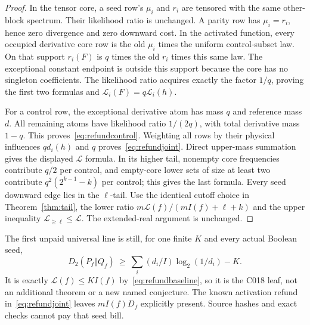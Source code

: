 \documentclass[11pt]{article}
\begin{document}
\begin{proof}
In the tensor core, a seed row's $\mu_i$ and $r_i$ are tensored with
the same other-block spectrum. Their likelihood ratio is unchanged.
A parity row has $\mu_i=r_i$, hence zero divergence and zero downward cost.
In the activated function, every occupied derivative core row is the
old $\mu_i$ times the uniform control-subset law. On that support
$r_i(F)$ is $q$ times the old $r_i$ times this same law. The exceptional
constant endpoint is outside this support because the core has no singleton
coefficients. The likelihood ratio acquires exactly the factor $1/q$,
proving the first two formulas and $\mathcal L_i(F)=q\mathcal L_i(h)$.

For a control row, the exceptional derivative atom has mass $q$ and
reference mass $d$. All remaining atoms have likelihood ratio $1/(2q)$,
with total derivative mass $1-q$. This proves~\eqref{eq:refundcontrol}.
Weighting all rows by their physical influences $qd_i(h)$ and $q$
proves~\eqref{eq:refundjoint}. Direct upper-mass summation gives
the displayed $\mathcal L$ formula. In its higher tail, nonempty core
frequencies contribute $q/2$ per control, and empty-core lower sets of
size at least two contribute $q^2(2^{k-1}-k)$ per control; this gives
the last formula. Every seed downward edge lies in the $\ell$-tail.
Use the identical cutoff choice in Theorem~\ref{thm:tail}, the lower
ratio $m\mathcal L(f)/(mI(f)+\ell+k)$ and the upper inequality
$\mathcal L_{\ge\ell}\le\mathcal L$. The extended-real argument is unchanged.
\end{proof}
The first unpaid universal line is still, for one finite $K$ and every
actual Boolean seed,
\[
 D_2(P_f\Vert Q_f)\ \ge\ \sum_i(d_i/I)\log_2(1/d_i)-K.
\]
It is exactly $\mathcal L(f)\le KI(f)$ by~\eqref{eq:refundbaseline},
so it is the C018 leaf, not an additional theorem or a new named conjecture.
The known activation refund in~\eqref{eq:refundjoint} leaves $mI(f)D_f$
explicitly present. Source hashes and exact checks cannot pay that seed bill.
\end{document}

